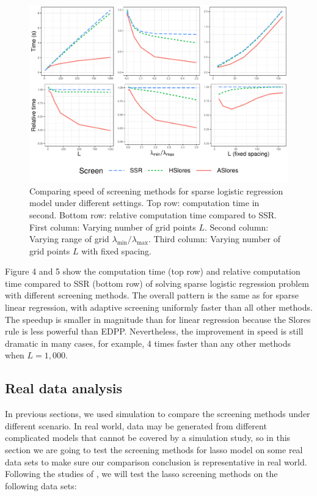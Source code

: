 \begin{figure}[h]
    \centering
    \includegraphics[scale = 0.59]{plots/512b.pdf}    \caption{Comparing speed of screening methods for sparse logistic regression model under different settings. Top row: computation time in second. Bottom row: relative computation time compared to SSR. First column: Varying number of grid points $L$. Second column: Varying range of grid $\lambda_{\min}/\lambda_{\max}$. Third column: Varying number of grid points $L$ with fixed spacing.}
    \label{fig:5.1.2b}
\end{figure}

Figure 4 and 5 show the computation time (top row) and relative computation time compared to SSR (bottom row) of solving sparse logistic regression problem with different screening methods. The overall pattern is the same as for sparse linear regression, with adaptive screening uniformly faster than all other methods. The speedup is smaller in magnitude than for linear regression because the Slores rule is less powerful than EDPP. Nevertheless, the improvement in speed is still dramatic in many cases, for example, 4 times faster than any other methods when $L=1,000$.

\subsection{Real data analysis}
\label{sec:real-data}

In previous sections, we used simulation to compare the screening methods under different scenario. In real world, data may be generated from different complicated models that cannot be covered by a simulation study, so in this section we are going to test the screening methods for lasso model on some real data sets to make sure our comparison conclusion is representative in real world. Following the studies of \citep{wang2013lasso, xiang2016screening, Zeng2021}, we will test the lasso screening methods on the following data sets:

